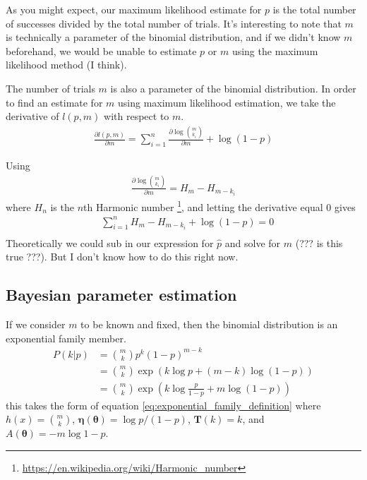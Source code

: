 \documentclass[a4paper,12pt]{article}
\theoremstyle{definition}
\newcommand{\pdiff}[2]{\frac{\partial #1}{\partial #2}} %
\begin{document}
As you might expect, our maximum likelihood estimate for $p$ is the total number of successes divided by the total number of trials. It's interesting to note that $m$ is technically a parameter of the binomial distribution, and if we didn't know $m$ beforehand, we would be unable to estimate $p$ or $m$ using the maximum likelihood method (I think).

The number of trials $m$ is also a parameter of the binomial distribution. In order to find an estimate for $m$ using maximum likelihood estimation, we take the derivative of $l(p, m)$ with respect to $m$.
\begin{align}
  \pdiff{l(p, m)}{m} = \sum_{i=1}^n \pdiff{\log{\binom{m}{k_i}}}{m} + \log(1-p)
\end{align}

Using 
\begin{align}
  \pdiff{\log \binom{m}{k_i}}{m} = H_m - H_{m - k_i}
\end{align}
where $H_n$ is the $n$th Harmonic number \footnote{\url{https://en.wikipedia.org/wiki/Harmonic_number}}, and letting the derivative equal 0 gives 
\begin{align}
   & \sum_{i=1}^n H_m - H_{m - k_i} + \log (1-p) = 0 \\ 
\end{align}
Theoretically we could sub in our expression for $\hat{p}$ and solve for $m$ (??? is this true ???). But I don't know how to do this right now.

\subsection{Bayesian parameter estimation}
If we consider $m$ to be known and fixed, then the binomial distribution is an exponential family member.
\begin{align}
  P(k | p) & = \binom{m}{k} p^{k}(1-p)^{m-k} \\
  & = \binom{m}{k} \exp \left( k \log p + (m-k) \log (1-p) \right) \\
  & = \binom{m}{k} \exp \left( k \log \frac{p}{1-p} + m \log (1-p) \right)
\end{align}
this takes the form of equation \ref{eq:exponential_family_definition} where $h(x) = \binom{m}{k}$, $\boldsymbol{\eta}(\boldsymbol{\theta}) = \log p/(1-p)$, $\mathbf{T}(k) = k$, and $A(\boldsymbol{\theta}) = -m \log 1-p$. 
\end{document}
